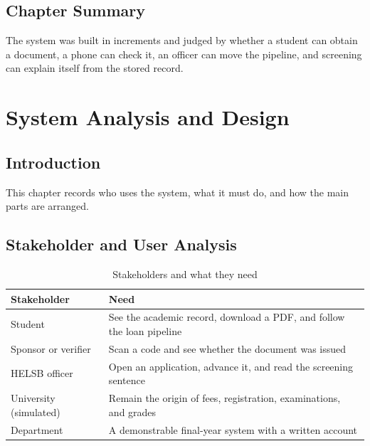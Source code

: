 \documentclass[12pt,a4paper]{report}
\begin{document}
\section{Chapter Summary}
The system was built in increments and judged by whether a student can obtain a document, a phone can check it, an officer can move the pipeline, and screening can explain itself from the stored record.

\chapter{System Analysis and Design}

\section{Introduction}
This chapter records who uses the system, what it must do, and how the main parts are arranged.

\section{Stakeholder and User Analysis}
\begin{table}[H]
\centering
\caption{Stakeholders and what they need}
\label{tab:stakeholders}
\begin{tabular}{p{}p{}}
\toprule
Stakeholder & Need\\
\midrule
Student & See the academic record, download a PDF, and follow the loan pipeline\\
Sponsor or verifier & Scan a code and see whether the document was issued\\
HELSB officer & Open an application, advance it, and read the screening sentence\\
University (simulated) & Remain the origin of fees, registration, examinations, and grades\\
Department & A demonstrable final-year system with a written account\\
\bottomrule
\end{tabular}
\end{table}
\end{document}
